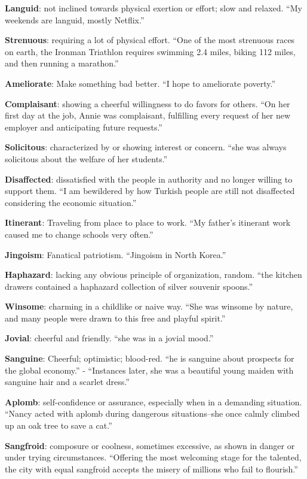 \documentclass[12pt, a4paper]{ximera}
\begin{document}
\textbf{Languid}: not inclined towards physical exertion or effort; slow and relaxed. ``My weekends are languid, mostly Netflix.''

\textbf{Strenuous}: requiring a lot of physical effort. ``One of the most strenuous races on earth, the Ironman Triathlon requires swimming 2.4 miles, biking 112 miles, and then running a marathon.''

\textbf{Ameliorate}: Make something bad better. ``I hope to ameliorate poverty.''

\textbf{Complaisant}: showing a cheerful willingness to do favors for others. ``On her first day at the job, Annie was complaisant, fulfilling every request of her new employer and anticipating future requests.''

\textbf{Solicitous}: characterized by or showing interest or concern. ``she was always solicitous about the welfare of her students.''

\textbf{Disaffected}: dissatisfied with the people in authority and no longer willing to support them. ``I am bewildered by how Turkish people are still not disaffected considering the economic situation.''

\textbf{Itinerant}: Traveling from place to place to work. ``My father's itinerant work caused me to change schools very often.''

\textbf{Jingoism}: Fanatical patriotism. ``Jingoism in North Korea.''

\textbf{Haphazard}: lacking any obvious principle of organization, random. ``the kitchen drawers contained a haphazard collection of silver souvenir spoons.''

\textbf{Winsome}: charming in a childlike or naive way. ``She was winsome by nature, and many people were drawn to this free and playful spirit.''

\textbf{Jovial}: cheerful and friendly. ``she was in a jovial mood.''

\textbf{Sanguine}: Cheerful; optimistic; blood-red. ``he is sanguine about prospects for the global economy.'' - ``Instances later, she was a beautiful young maiden with sanguine hair and a scarlet dress.''

\textbf{Aplomb}: self-confidence or assurance, especially when in a demanding situation. ``Nancy acted with aplomb during dangerous situations--she once calmly climbed up an oak tree to save a cat.''

\textbf{Sangfroid}: composure or coolness, sometimes excessive, as shown in danger or under trying circumstances. ``Offering the most welcoming stage for the talented, the city with equal sangfroid accepts the misery of millions who fail to flourish.''
\end{document}
